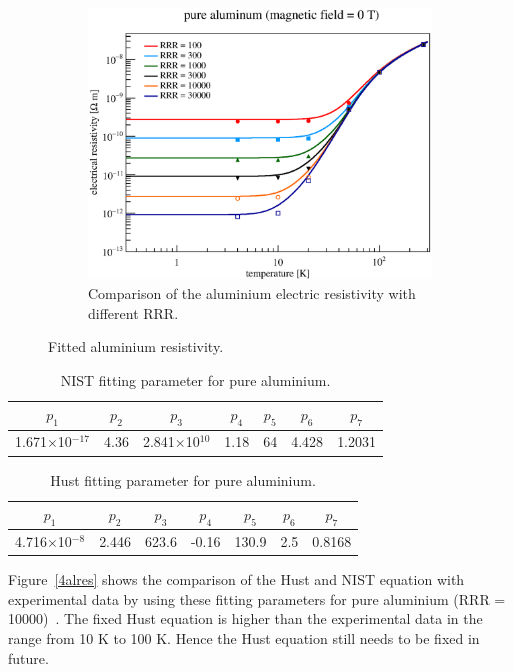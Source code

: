 \begin{figure}[H]
\begin{subfigure}{3.1in}
    \includegraphics[scale=0.45]{chapter5/fig/resist.eps}
	\caption{Comparison of the aluminium electric resistivity with different RRR.}
    \label{4alres2}
   \end{subfigure}
   \caption{Fitted aluminium resistivity.}
  \end{figure}

\begin{table}[H]
 \centering
 \begin{tabular}{ccccccc} \hline \hline
  $p_1$ & $p_2$ & $p_3$ & $p_4$ & $p_5$ & $p_6$ & $p_7$ \\ \hline
  1.671$\times$10$^{-17}$ & 4.36 & 2.841$\times$10$^{10}$ & 1.18 & 64 & 4.428 & 1.2031 \\ \hline \hline
 \end{tabular}
 \caption{NIST fitting parameter for pure aluminium.}
 \label{paraAl}
\end{table}
\begin{table}[H]
 \centering
 \begin{tabular}{ccccccc} \hline \hline
  $p_1$ & $p_2$ & $p_3$ & $p_4$ & $p_5$ & $p_6$ & $p_7$ \\ \hline
  4.716$\times$10$^{-8}$ & 2.446 & 623.6 & -0.16 & 130.9 & 2.5 & 0.8168 \\ \hline \hline
 \end{tabular}
 \caption{Hust fitting parameter for pure aluminium.}
 \label{paraAl2}
\end{table}
Figure~\ref{4alres} shows the comparison of the Hust and NIST equation with experimental data by using these fitting parameters for pure aluminium (RRR = 10000)~\cite{desai}.
The fixed Hust equation is higher than the experimental data in the range from 10 K to 100 K.
Hence the Hust equation still needs to be fixed in future.

